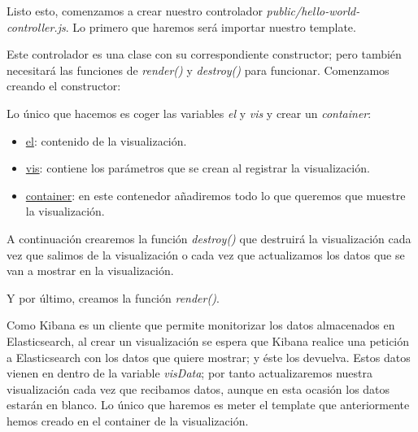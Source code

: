 \documentclass[a4paper, 12pt]{book}
\begin{document}


Listo esto, comenzamos a crear nuestro controlador \textit{public/hello-world-controller.js}. Lo primero que haremos será importar nuestro template.



Este controlador es una clase con su correspondiente constructor; pero también necesitará las funciones de \textit{render()} y \textit{destroy()} para funcionar. Comenzamos creando el constructor:



Lo único que hacemos es coger las variables \textit{el} y \textit{vis} y crear un \textit{container}:

\begin{itemize}
    \item \underline{el}: contenido de la visualización.
    \item \underline{vis}: contiene los parámetros que se crean al registrar la visualización.
    \item \underline{container}: en este contenedor añadiremos todo lo que queremos que muestre la visualización.
\end{itemize}

A continuación crearemos la función \textit{destroy()} que destruirá la visualización cada vez que salimos de la visualización o cada vez que actualizamos los datos que se van a mostrar en la visualización.



Y por último, creamos la función \textit{render()}.



Como Kibana es un cliente que permite monitorizar los datos almacenados en Elasticsearch, al crear un visualización se espera que Kibana realice una petición a Elasticsearch con los datos que quiere mostrar; y éste los devuelva. Estos datos vienen en dentro de la variable \textit{visData}; por tanto actualizaremos nuestra visualización cada vez que recibamos datos, aunque en esta ocasión los datos estarán en blanco. 
Lo único que haremos es meter el template que anteriormente hemos creado en el container de la visualización.
\end{document}
